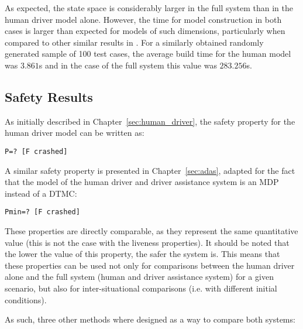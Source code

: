 As expected, the state space is considerably larger in the full system than in the human driver model alone. However, the time for model construction in both cases is larger than expected for models of such dimensions, particularly when compared to other similar results in \cite{lam}. For a similarly obtained randomly generated sample of 100 test cases, the average build time for the human model was $3.861$s and in the case of the full system this value was $283.256$s.

\subsection{Safety Results}
\label{sec:res_safety}

As initially described in Chapter~\ref{sec:human_driver}, the safety property for the human driver model can be written as:

\begin{minipage}{\linewidth}
{\vspace{1em}
\begin{lstlisting}
P=? [F crashed]
\end{lstlisting}
}
\end{minipage}

A similar safety property is presented in Chapter~\ref{sec:adas}, adapted for the fact that the model of the human driver and driver assistance system is an MDP instead of a DTMC:

\begin{minipage}{\linewidth}
{\vspace{1em}
\begin{lstlisting}
Pmin=? [F crashed]
\end{lstlisting}
}
\end{minipage}

These properties are directly comparable, as they represent the same quantitative value (this is not the case with the liveness properties). It should be noted that the lower the value of this property, the safer the system is. This means that these properties can be used not only for comparisons between the human driver alone and the full system (human and driver assistance system) for a given scenario, but also for inter-situational comparisons (i.e. with different initial conditions).

As such, three other methods where designed as a way to compare both systems: 

